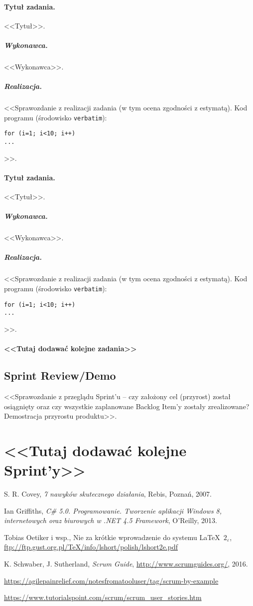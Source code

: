 \documentclass[a4paper]{article}
\begin{document}
\paragraph{Tytuł zadania.} <<Tytuł>>.
\subparagraph{Wykonawca.} <<Wykonawca>>.
\subparagraph{Realizacja.} <<Sprawozdanie z realizacji zadania (w tym ocena zgodności z estymatą). Kod programu (środowisko \texttt{verbatim}): \begin{verbatim}
for (i=1; i<10; i++)
...
\end{verbatim}>>.

\paragraph{Tytuł zadania.} <<Tytuł>>.
\subparagraph{Wykonawca.} <<Wykonawca>>.
\subparagraph{Realizacja.} <<Sprawozdanie z realizacji zadania (w tym ocena zgodności z estymatą). Kod programu (środowisko \texttt{verbatim}): \begin{verbatim}
for (i=1; i<10; i++)
...
\end{verbatim}>>.

\paragraph{<<Tutaj dodawać kolejne zadania>>}


\subsection{Sprint Review/Demo}
<<Sprawozdanie z przeglądu Sprint'u -- czy założony cel (przyrost) został osiągnięty oraz czy wszystkie zaplanowane Backlog Item'y zostały zrealizowane? Demostracja przyrostu produktu>>.

\section*{<<Tutaj dodawać kolejne Sprint'y>>}


\begin{thebibliography}{9}

 S. R. Covey, {\em 7 nawyków skutecznego działania}, Rebis, Poznań, 2007.

 Ian Griffiths, {\em C\# 5.0. Programowanie. Tworzenie aplikacji Windows 8, internetowych oraz biurowych w .NET 4.5 Framework}, O’Reilly, 2013.

 Tobias Oetiker i wsp., Nie za krótkie wprowadzenie do systemu \LaTeX  \ $2_\varepsilon$, \url{ftp://ftp.gust.org.pl/TeX/info/lshort/polish/lshort2e.pdf}

 K. Schwaber, J. Sutherland, {\em Scrum Guide}, \url{http://www.scrumguides.org/}, 2016.

 \url{https://agilepainrelief.com/notesfromatooluser/tag/scrum-by-example}

 \url{https://www.tutorialspoint.com/scrum/scrum_user_stories.htm}

\end{thebibliography}
\end{document}
